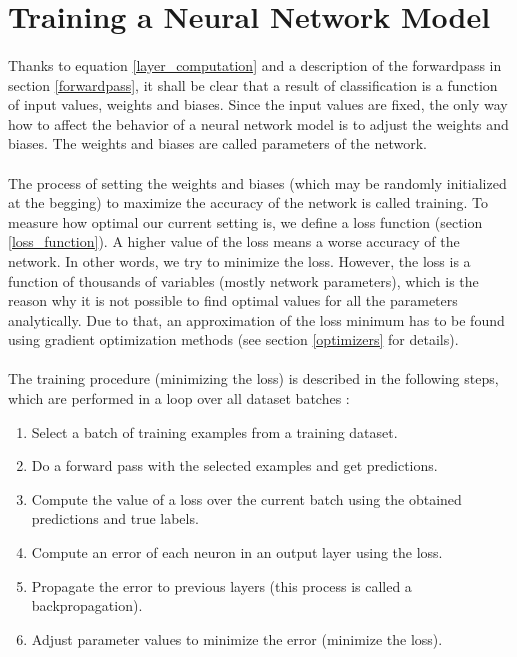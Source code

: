\section{Training a Neural Network Model}\label{training}
\paragraph{}
Thanks to equation \ref{layer_computation} and a description of the forwardpass in section \ref{forwardpass}, it shall be clear that a result of classification is a function of input values, weights and biases. Since the input values are fixed, the only way how to affect the behavior of a neural network model is to adjust the weights and biases. The weights and biases are called parameters of the network.

\paragraph{}
The process of setting the weights and biases (which may be randomly initialized at the begging) to maximize the accuracy of the network is called training. To measure how optimal our current setting is, we define a loss function (section \ref{loss_function}). A higher value of the loss means a worse accuracy of the network. In other words, we try to minimize the loss. However, the loss is a function of thousands of variables (mostly network parameters),
which is the reason why it is not possible to find optimal values for all the
parameters analytically. Due to that, an approximation of the loss minimum
has to be found using gradient optimization methods (see section \ref{optimizers} for details).

\paragraph{}
The training procedure (minimizing the loss) is described in the following steps, which are performed in a loop over all dataset batches \cite{deep_learning_with_python}:

\begin{enumerate}
	\item Select a batch of training examples from a training dataset.
	\item Do a forward pass with the selected examples and get predictions.
	\item Compute the value of a loss over the current batch using the obtained predictions and true labels.
	\item Compute an error of each neuron in an output layer using the loss.
	\item Propagate the error to previous layers (this process is called a backpropagation).
	\item Adjust parameter values to minimize the error (minimize the loss).
\end{enumerate}

